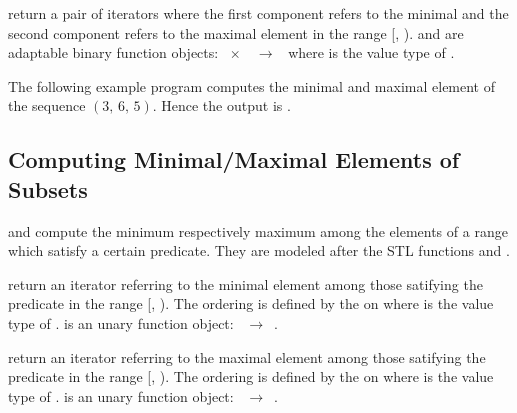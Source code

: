  {return a pair of iterators where the first
  component refers to the minimal and the second component refers to the
  maximal element in the range [, ).  and
   are adaptable binary function objects:
  ~$\times$~~$\rightarrow$~ where  is the value type
  of .}

\ccExample The following example program computes the minimal and maximal
element of the sequence $(3,\,6,\,5)$. Hence the output is .


\def\ccLongParamLayout{\ccTrue} 

\subsection{Computing Minimal/Maximal Elements of Subsets}
\label{sectionMinElementIf}

 and  compute the minimum
respectively maximum among the elements of a range which satisfy a certain
predicate. They are modeled after the STL functions  and
.


{return an iterator referring to the minimal element among those satifying the
  predicate  in the range [, ). The ordering is
  defined by the  on  where  is the value type
  of .  is an unary function object:
  ~$\rightarrow$~.}

{return an iterator referring to the maximal element among those satifying the
  predicate  in the range [, ). The ordering is
  defined by the  on  where  is the value type
  of .  is an unary function object:
  ~$\rightarrow$~.}

